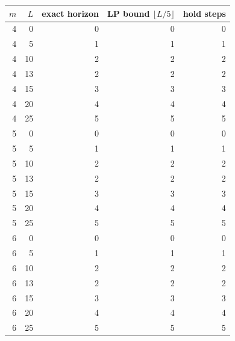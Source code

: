 \begin{tabular}{rrrrr}
\toprule
$m$ & $L$ & exact horizon & LP bound $\lfloor L/5\rfloor$ & hold steps\\
\midrule
4 & 0 & 0 & 0 & 0\\
4 & 5 & 1 & 1 & 1\\
4 & 10 & 2 & 2 & 2\\
4 & 13 & 2 & 2 & 2\\
4 & 15 & 3 & 3 & 3\\
4 & 20 & 4 & 4 & 4\\
4 & 25 & 5 & 5 & 5\\
5 & 0 & 0 & 0 & 0\\
5 & 5 & 1 & 1 & 1\\
5 & 10 & 2 & 2 & 2\\
5 & 13 & 2 & 2 & 2\\
5 & 15 & 3 & 3 & 3\\
5 & 20 & 4 & 4 & 4\\
5 & 25 & 5 & 5 & 5\\
6 & 0 & 0 & 0 & 0\\
6 & 5 & 1 & 1 & 1\\
6 & 10 & 2 & 2 & 2\\
6 & 13 & 2 & 2 & 2\\
6 & 15 & 3 & 3 & 3\\
6 & 20 & 4 & 4 & 4\\
6 & 25 & 5 & 5 & 5\\
\bottomrule
\end{tabular}
